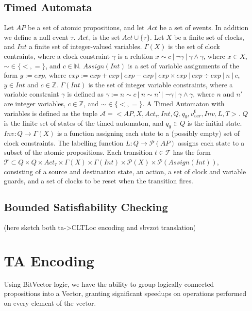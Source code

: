 \documentclass[a4paper,11pt]{article}
\begin{document}
\subsection{Timed Automata}
\label{sec:org567fabd}
Let \(AP\) be a set of atomic propositions, and let \(Act\) be a set of events.
In addition we define a null event \(\tau\). \(Act_{\tau}\) is the set \(Act
\cup \{\tau\}\). Let \(X\) be a finite set of clocks, and \(Int\) a finite set
of integer-valued variables. \(\Gamma(X)\) is the set of clock contraints, where
a clock constraint \(\gamma\) is a relation \(x \sim c\ |\ \neg \gamma\ |\
\gamma \land \gamma\), where \(x \in X\), \(\sim \in \{<,=\}\), and \(c \in
\mathbb{N}\). \(Assign(Int)\) is a set of variable assignments of the form \(y
:= exp\), where \(exp := exp + exp\ |\ exp - exp\ |\ exp \times exp\ |\ exp \div
exp\ |\ n\ |\ c\), \(y \in Int\) and \(c \in \mathbb{Z}\). \(\Gamma(Int)\) is
the set of integer variable constraints, where a variable constraint \(\gamma\)
is defined as \(\gamma := n \sim c\ |\ n \sim n'\ |\ \neg \gamma\ |\ \gamma
\land \gamma\), where \(n\) and \(n'\) are integer variables, \(c \in
\mathbb{Z}\), and \(\sim \in \{<,=\}\). A Timed Automaton with variables is
defined as the tuple \(\mathcal{A} = <AP,X, Act_{\tau}, Int, Q, q_0, v_{var}^0,
Inv, L, T>\). \(Q\) is the finite set of states of the timed automaton, and
\(q_0 \in Q\) is the initial state. \(Inv : Q \rightarrow \Gamma(X)\) is a
function assigning each state to a (possibly empty) set of clock constraints.
The labelling function \(L: Q \rightarrow \mathcal{P}(AP)\) assigns each state
to a subset of the atomic propositions. Each transition \(t \in \mathcal{T}\)
has the form \(\mathcal{T} \subset Q \times Q \times Act_{\tau} \times \Gamma(X)
\times \Gamma(Int) \times \mathcal{P}(X) \times \mathcal{P}(Assign(Int))\),
consisting of a source and destination state, an action, a set of clock and
variable guards, and a set of clocks to be reset when the transition fires.

\subsection{Bounded Satisfiability Checking}
\label{sec:orgc4c98ac}
(here sketch both ta->CLTLoc encoding and sbvzot translation)
\section{TA Encoding}
\label{sec:org999afac}
Using BitVector logic, we have the ability to group logically connected
propositions into a Vector, granting significant speedups on operations
performed on every element of the vector.
\end{document}
